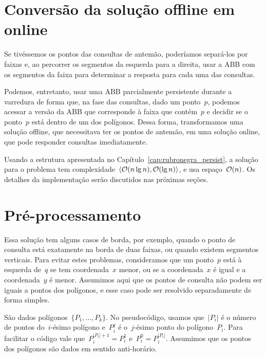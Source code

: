 \documentclass[../../main.tex]{subfiles}
\begin{document}
\section{Conversão da solução offline em online}

Se tivéssemos os pontos das consultas de antemão, poderíamos separá-los por faixas e, ao percorrer os segmentos da esquerda para a direita, usar a ABB com os segmentos da faixa para determinar a resposta para cada uma das consultas.

Podemos, entretanto, usar uma ABB parcialmente persistente durante a varredura de forma que, na fase das consultas, dado um ponto~$p$, podemos acessar a versão da ABB que corresponde à faixa que contém~$p$ e decidir se o ponto~$p$ está dentro de um dos polígonos. Dessa forma, transformamos uma solução offline, que necessitava ter os pontos de antemão, em uma solução online, que pode responder consultas imediatamente.

Usando a estrutura apresentada no Capítulo~\ref{cap:rubronegra_persist}, a solução para o problema tem complexidade~$\langle\mathcal{O}(n \lg n), \mathcal{O}(\lg n)\rangle$, e usa espaço~$\mathcal{O}(n)$. Os detalhes da implementação serão discutidos nas próximas seções.


\section{Pré-processamento}

Essa solução tem alguns casos de borda, por exemplo, quando o ponto de consulta está exatamente na borda de duas faixas, ou quando existem segmentos verticais. Para evitar estes problemas, consideramos que um ponto~$p$ está à esquerda de~$q$ se tem coordenada~$x$ menor, ou se a coordenada~$x$ é igual e a coordenada~$y$ é menor. Assumimos aqui que os pontos de consulta não podem ser iguais a pontos dos polígonos, e esse caso pode ser resolvido separadamente de forma simples.

\providecommand{\from}{\V{from}}
\providecommand{\tto}{\V{to}}
\providecommand{\topp}{\V{top}}
\providecommand{\seg}{\V{seg}}
\providecommand{\add}{\V{add}}
\providecommand{\events}{\V{points}}
\providecommand{\rbt}{\V{rbt}}
\providecommand{\slabs}{\V{slabs}}
\providecommand{\current}{\V{current}}
\providecommand{\polygon}{\V{polygon}}

São dados polígonos~$\{P_1, \ldots, P_k\}$. No pseudocódigo, usamos que~$|P_i|$ é o número de pontos do~\mbox{$i$-ésimo} polígono e~$P_i^j$ é o~$j$-ésimo ponto do polígono~$P_i$. Para facilitar o código vale que~${P_i^{|P_i|+1} = P_i^1}$ e~${P_i^0 = P_i^{|P_i|}}$. Assumimos que os pontos dos polígonos são dados em sentido anti-horário.
\end{document}
